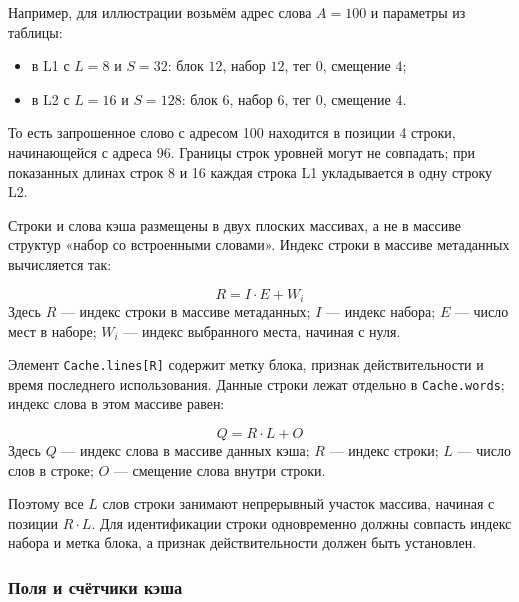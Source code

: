 \documentclass[12pt,a4paper]{article}
\begin{document}
Например, для иллюстрации возьмём адрес слова $A=100$ и параметры из таблицы:

\begin{itemize}[leftmargin=1.5em]
    \item в L1 с $L=8$ и $S=32$: блок $12$, набор $12$, тег $0$, смещение $4$;
    \item в L2 с $L=16$ и $S=128$: блок $6$, набор $6$, тег $0$, смещение $4$.
\end{itemize}

То есть запрошенное слово с адресом 100 находится в позиции 4 строки, начинающейся с адреса 96. Границы строк уровней могут не совпадать; при показанных длинах строк 8 и 16 каждая строка L1 укладывается в одну строку L2.

Строки и слова кэша размещены в двух плоских массивах, а не в массиве структур «набор со встроенными словами». Индекс строки в массиве метаданных вычисляется так:

\begin{equation}
    \boxed{R = I \cdot E + W_i}
\end{equation}
Здесь $R$ --- индекс строки в массиве метаданных; $I$ --- индекс набора; $E$ --- число мест в наборе; $W_i$ --- индекс выбранного места, начиная с нуля.

Элемент \texttt{Cache.lines[R]} содержит метку блока, признак действительности и время последнего использования. Данные строки лежат отдельно в \texttt{Cache.words}; индекс слова в этом массиве равен:

\begin{equation}
    \boxed{Q = R \cdot L + O}
\end{equation}
Здесь $Q$ --- индекс слова в массиве данных кэша; $R$ --- индекс строки; $L$ --- число слов в строке; $O$ --- смещение слова внутри строки.

Поэтому все $L$ слов строки занимают непрерывный участок массива, начиная с позиции $R \cdot L$. Для идентификации строки одновременно должны совпасть индекс набора и метка блока, а признак действительности должен быть установлен.

\subsubsection{Поля и счётчики кэша}
\end{document}
